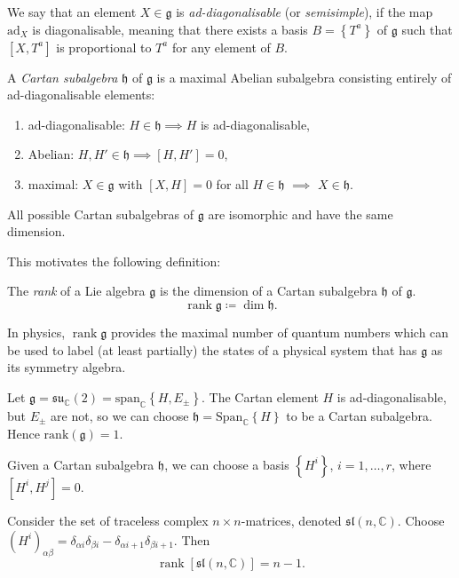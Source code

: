 \begin{definition}[ad-diagonalisable]
  We say that an element $X \in \mathfrak{g}$ is \emph{ad-diagonalisable} (or \emph{semisimple}), if the map $\text{ad}_X$ is diagonalisable, meaning that there exists a basis $B = \left\{T^a\right\}$ of $\mathfrak{g}$ such that $[X, T^a]$ is proportional to $T^a$ for any element of $B$.
\end{definition}
\begin{definition}
  A \emph{Cartan subalgebra} $\mathfrak{h}$ of $\mathfrak{g}$ is a maximal Abelian subalgebra consisting entirely of ad-diagonalisable elements:
  \begin{enumerate}
    \item ad-diagonalisable: $H \in \mathfrak{h} \implies H$ is ad-diagonalisable,
    \item Abelian: $H, H' \in \mathfrak{h} \implies [H, H'] = 0$,
    \item maximal: $X \in \mathfrak{g}$ with $[X, H] = 0$ for all $H \in \mathfrak{h}$ $\implies$ $X \in \mathfrak{h}$.
  \end{enumerate}
\end{definition}
\begin{claim}
  All possible Cartan subalgebras of $\mathfrak{g}$ are isomorphic and have the same dimension. 
\end{claim}
This motivates the following definition:
\begin{definition}
  The \emph{rank} of a Lie algebra $\mathfrak{g}$ is the dimension of a Cartan subalgebra $\mathfrak{h}$ of $\mathfrak{g}$.
  \begin{equation}
    \operatorname{rank} \mathfrak{g} \coloneqq \dim \mathfrak{h}.
  \end{equation}
\end{definition}
\begin{leftbar}
  In physics, $\operatorname{rank} \mathfrak{g}$ provides the maximal number of quantum numbers which can be used to label (at least partially) the states of a physical system that has $\mathfrak{g}$ as its symmetry algebra. \cite{fuchs}
\end{leftbar}


\begin{example} 
  Let $\mathfrak{g} = \mathfrak{su}_{\mathbb{C}}(2) = \text{span}_{\mathbb{C}} \left\{ H, E_{\pm} \right\}$.  The Cartan element $H$ is ad-diagonalisable, but $E_{\pm}$ are not, so we can choose $\mathfrak{h} = \text{Span}_{\mathbb{C}}\left\{H\right\}$ to be a Cartan subalgebra. Hence $\text{rank}(\mathfrak{g}) = 1$. 
\end{example}
Given a Cartan subalgebra $\mathfrak{h}$, we can choose a basis $\left\{ H^{i}\right\}$, $ i = 1, \dots, r$, where $[H^{i}, H^{j}] = 0$.
\begin{example}[]
  Consider the set of traceless complex $n \times n$-matrices, denoted $\mathfrak{sl}(n, \mathbb{C})$.
  Choose $(H^{i})_{\alpha\beta} = \delta_{\alpha i} \delta_{\beta i} - \delta_{\alpha i + 1} \delta_{\beta i + 1}$.
  Then 
  \begin{equation}
    \operatorname{rank} [\mathfrak{sl}(n, \mathbb{C})] = n-1.
  \end{equation}
\end{example}

